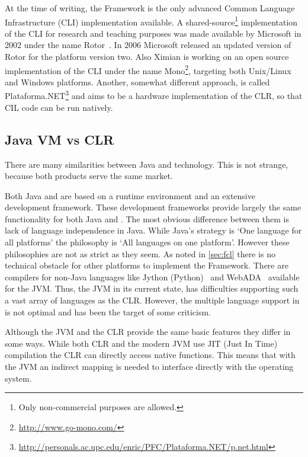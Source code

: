 At the time of writing, the \dotNET Framework is the only advanced Common Language Infrastructure (CLI) implementation available.
A shared-source\footnote{Only non-commercial purposes are allowed.} implementation of the CLI for research and teaching purposes was made available by Microsoft in 2002 under the name Rotor~\cite{Stutz02}. In 2006 Microsoft released an updated version of Rotor for the \dotNET platform version two.
Also Ximian is working on an open source implementation of the CLI under the name Mono\footnote{\url{http://www.go-mono.com/}}, targeting both Unix/Linux and Windows platforms.
Another, somewhat different approach, is called Plataforma.NET\footnote{\url{http://personals.ac.upc.edu/enric/PFC/Plataforma.NET/p.net.html}} and aims to be a hardware implementation of the CLR, so that CIL code can be run natively.

\subsection{Java VM vs \dotNET CLR}
There are many similarities between Java and \dotNET technology. This is not strange, because both products serve the same market.

Both Java and \dotNET are based on a runtime environment and an extensive development framework.
These development frameworks provide largely the same functionality for both Java and \dotNET.
The most obvious difference between them is lack of language independence in Java.
While Java's strategy is `One language for all platforms' the \dotNET philosophy is `All languages on one platform'.
However these philosophies are not as strict as they seem.
As noted in \autoref{sec:fcl} there is no technical obstacle for other platforms to implement the \dotNET Framework.
There are compilers for non-Java languages like Jython (Python)~\cite{Jython03} and WebADA~\cite{Ada96} available for the JVM.
Thus, the JVM in its current state, has difficulties supporting such a vast array of languages as the CLR.
However, the multiple language support in \dotNET is not optimal and has been the target of some criticism.

Although the JVM and the CLR provide the same basic features they differ in some ways.
While both CLR and the modern JVM use JIT (Just In Time) compilation the CLR can directly access native functions.
This means that with the JVM an indirect mapping is needed to interface directly with the operating system.